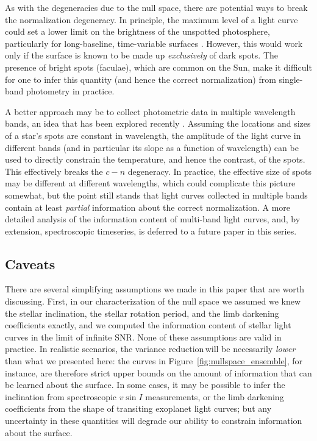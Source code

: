 \documentclass[modern,linenumbers]{aastex62}
\newcommand{\shrinkage}{{variance reduction\,}}
\begin{document}

As with the degeneracies due to the null space, there are potential ways
to break the normalization degeneracy.
%
In principle, the maximum level of a light curve could set a lower limit on
the brightness of the
unspotted photosphere, particularly for long-baseline, time-variable
surfaces \citep{Basri2018}. However, this would work only if the surface is
known to be made up \emph{exclusively} of dark spots. The presence of bright
spots (faculae), which are common on the Sun, make it difficult
for one to infer this quantity (and hence the correct normalization)
from single-band photometry in practice.

A better approach may be to collect photometric data in
multiple wavelength bands, an idea that has
been explored recently \citep[e.g.,][]{Gully2017,Guo2018}. Assuming the
locations and sizes of a star's spots are constant in wavelength, the amplitude
of the light curve in different bands (and in particular its slope as a function
of wavelength) can be used to directly constrain the
temperature, and hence the contrast, of the spots. This effectively breaks the
$c-n$ degeneracy. In practice, the effective size of spots may be different
at different wavelengths, which could complicate this picture somewhat, but
the point still stands that light curves collected in multiple bands
contain at least \emph{partial} information about the correct normalization.
%
A more detailed analysis of the information content of multi-band light curves,
and, by extension, spectroscopic timeseries, is deferred to a future paper
in this series.

\subsection{Caveats}
\label{sec:caveats}

There are several simplifying assumptions we made in this paper that
are worth discussing. First, in our characterization of the null space
we assumed we knew the stellar inclination, the stellar rotation period,
and the limb darkening coefficients
exactly, and we computed the information content of stellar light curves
in the limit of infinite SNR. None of these assumptions are valid in
practice. In realistic scenarios, the \shrinkage will be
necessarily \emph{lower} than what we presented here: the curves in
Figure~\ref{fig:nullspace_ensemble}, for instance, are therefore
strict upper bounds on the amount of information that can be learned about
the surface. In some cases, it may be possible to infer the inclination
from spectroscopic $v \sin I$ measurements, or the limb darkening coefficients
from the shape of transiting exoplanet light curves; but any uncertainty
in these quantities will degrade our ability to constrain
information about the surface.
\end{document}
